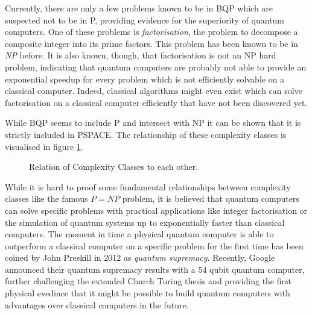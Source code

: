 Currently, there are only a few problems known to be in BQP which are suspected
 not to be in P, providing evidence for the superiority of quantum computers. One
of these problems is \textit{factorisation}, the problem to decompose a
composite integer into its prime factors. This problem has been known to be in
\textit{NP} before. It is also known, though, that factorisation is not an NP
hard problem, indicating that quantum computers are probably not able to provide
an exponential speedup for every problem which is not efficiently solvable on a
classical computer. Indeed, classical algorithms might even exist which can
solve factorisation on a classical computer efficiently that have not been
discovered yet.

While BQP seems to include P and intersect with NP it can be shown that it is strictly
included in PSPACE. The relationship of these complexity classes is visualised
in figure \ref{fig:complexityclasses}.

\begin{figure}[h]
  \centering
  \caption{Relation of Complexity Classes to each other.}
  \label{fig:complexityclasses}
\end{figure}

While it is hard to proof some fundamental relationships between complexity
classes like the famous $P = NP$ problem, it is believed that quantum computers
can solve specific problems with practical applications like integer factorisation or the simulation of
quantum systems up to exponentially faster than classical computers. The moment
in time a physical quantum computer is able to outperform a classical computer
on a specific problem for the first time has been coined by John Preskill in
2012 as \textit{quantum supremacy}. Recently, Google announced their quantum
supremacy results with a 54 qubit quantum computer, further challenging the
extended Church Turing thesis and providing the first physical evedince that it
might be possible to build quantum computers with advantages over classical
computers in the future.
